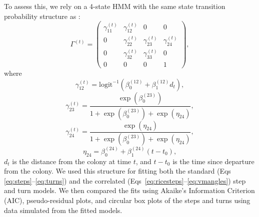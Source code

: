 \documentclass[12pt]{article}\usepackage[]{graphicx}\usepackage[]{xcolor}
\begin{document}
To assess this, we rely on a 4-state HMM with the same state transition probability structure as \cite{MichelotEtAl2017}:
\begin{equation*} 
\Gamma^{(t)} = 
  \begin{pmatrix} 
    \gamma_{11}^{(t)} & \gamma_{12}^{(t)} & 0 & 0 \\ 
    0 & \gamma_{22}^{(t)} & \gamma_{23}^{(t)} & \gamma_{24}^{(t)} \\ 
    0 & \gamma_{32}^{(t)} & \gamma_{33}^{(t)} & 0 \\ 
    0 & 0 & 0 & 1 
  \end{pmatrix}, 
\end{equation*}
where
\begin{equation*}
\gamma_{12}^{(t)} = \text{logit}^{-1} \left(\beta_0^{(12)}+\beta_1^{(12)}d_t\right),
\end{equation*}
\begin{equation*}
\gamma_{23}^{(t)} = \frac{\exp\left(\beta_0^{(23)}\right)}{1+\exp\left(\beta_0^{(23)}\right)+\exp\left(\eta_{24}\right)},
\end{equation*}
\begin{equation*}
\gamma_{24}^{(t)} = \frac{\exp\left(\eta_{24}\right)}{1+\exp\left(\beta_0^{(23)}\right)+\exp\left(\eta_{24}\right)},
\end{equation*}
\begin{equation*}
\eta_{24} = \beta_0^{(24)}+\beta_1^{(24)}\left(t - t_0\right),
\end{equation*}
$d_t$ is the distance from the colony at time $t$, and $t-t_0$ is the time since departure from the colony. We used this structure for fitting both the standard (Eqs \ref{eq:steps}--\ref{eq:turns}) and the correlated (Eqs\ \ref{eq:ricesteps}--\ref{eq:vmangles}) step and turn models. We then compared the fits using Akaike's Information Criterion (AIC), pseudo-residual plots, and circular box plots of the steps and turns using data simulated from the fitted models. 
\end{document}
